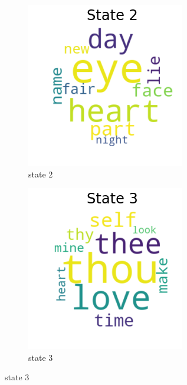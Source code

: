 \begin{figure}[H]
	\bigskip 

	\begin{subfigure}[t]{0.3\textwidth}
		\includegraphics[width=\textwidth]{s3.png}
		\caption{state 2}
	\end{subfigure}%
	\begin{subfigure}[t]{0.3\textwidth}
		\includegraphics[width=\textwidth]{s4.png}
		\caption{state 3}
	\end{subfigure}%
	
\end{figure}

